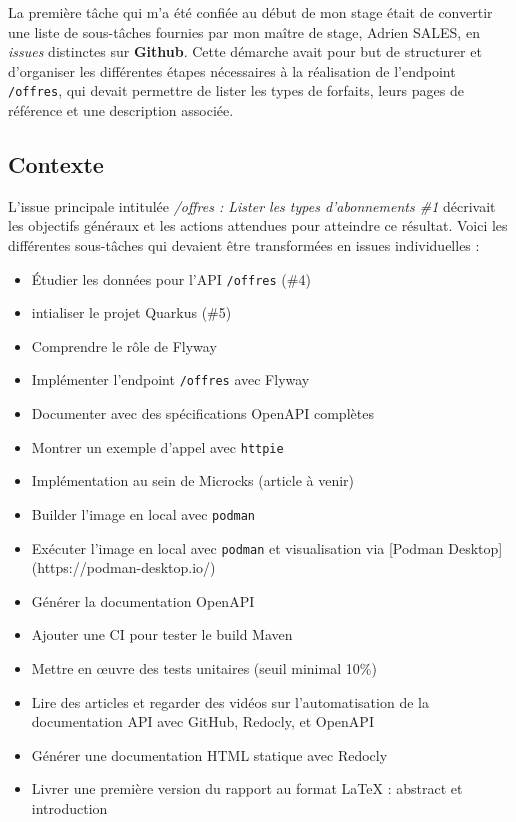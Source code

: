 \documentclass{article}
\begin{document}
	La première tâche qui m’a été confiée au début de mon stage était de convertir une liste de sous-tâches fournies par mon maître de stage, Adrien SALES, en \textit{issues} distinctes sur \textbf{Github}. Cette démarche avait pour but de structurer et d’organiser les différentes étapes nécessaires à la réalisation de l’endpoint \texttt{/offres}, qui devait permettre de lister les types de forfaits, leurs pages de référence et une description associée.
	
	\subsection{Contexte}
	
	L’issue principale intitulée \textit{/offres : Lister les types d'abonnements \#1} décrivait les objectifs généraux et les actions attendues pour atteindre ce résultat. Voici les différentes sous-tâches qui devaient être transformées en issues individuelles :
	
	\begin{itemize}
		\item Étudier les données pour l'API \texttt{/offres} (\#4)
		\item intialiser le projet Quarkus (\#5)
		\item Comprendre le rôle de Flyway
		\item Implémenter l'endpoint \texttt{/offres} avec Flyway
		\item Documenter avec des spécifications OpenAPI complètes
		\item Montrer un exemple d’appel avec \texttt{httpie}
		\item Implémentation au sein de Microcks (article à venir)
		\item Builder l’image en local avec \texttt{podman}
		\item Exécuter l’image en local avec \texttt{podman} et visualisation via [Podman Desktop](https://podman-desktop.io/)
		\item Générer la documentation OpenAPI
		\item Ajouter une CI pour tester le build Maven
		\item Mettre en œuvre des tests unitaires (seuil minimal 10\%)
		\item Lire des articles et regarder des vidéos sur l’automatisation de la documentation API avec GitHub, Redocly, et OpenAPI
		\item Générer une documentation HTML statique avec Redocly
		\item Livrer une première version du rapport au format \LaTeX{} : abstract et introduction
	\end{itemize}
	
\end{document}
